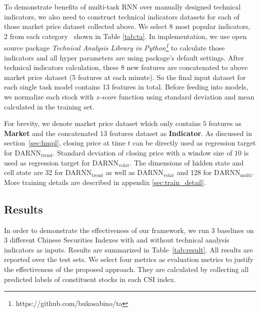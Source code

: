 \documentclass[sigconf,anonymous,review]{acmart}
\renewcommand{\cite}{\citep}
\begin{document}
To demonstrate benefits of multi-task RNN over
manually designed technical indicators, we also need to construct
technical indicators datasets for each of those market price
dataset collected above. We select 8 most popular indicators, 2
from each category~\cite{kirkpatrick2010technical} shown in Table
\ref{tab:ta}. In implementation, we use open source package
\emph{Technical Analysis Library in
  Python\footnote{https://github.com/bukosabino/ta}} to calculate
those indicators and all hyper parameters are using package's
default settings. After technical indicators calculation, these 8
new features are concatenated to above market price dataset (5
features at each minute). So the final input dataset for each single
task model contains 13 features in total. Before feeding into
models, we normalize each stock with \emph{z-score}
function using standard deviation and mean calculated in the training set.

For brevity, we denote market price dataset which only contains  $5$ features as \textbf{Market} and the concatenated $13$ features dataset as
\textbf{Indicator}. As discussed in section~\ref{sec:hmpl}, 
closing price at time $t$ can be directly used as regression 
target for $\text{DARNN}_{\text{trend}}$. 
Standard deviation of closing price with a window size of $10$ 
is used as regression target for $\text{DARNN}_{\text{volat}}$.
The dimensions of
hidden state and cell state are 32 for $\text{DARNN}_{\text{trend}}$ as well as $\text{DARNN}_{\text{volat}}$ and
128 for $\text{DARNN}_{\text{multi}}$. More training details are
described in appendix \ref{sec:train_detail}.

\subsection{Results}
\label{sec:res}

In order to demonstrate the effectiveness of our framework, we
run 3 baselines on 3 different Chinese Securities Indexes with
and without technical analysis indicators as inputs. Results are
summarized in Table~\ref{tab:result}. All results are reported over the test sets. We select four metrics as evaluation
metrics to justify the effectiveness of the proposed approach. They are calculated by collecting all
predicted labels of constituent stocks in each CSI index.
\end{document}
